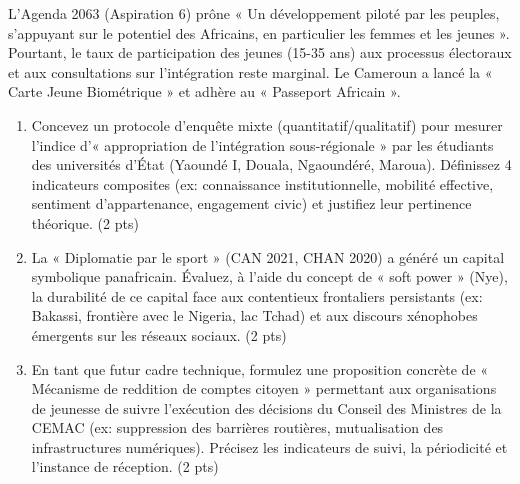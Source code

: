 \documentclass[11pt]{article}
\begin{document}
\begin{exercice}
L'Agenda 2063 (Aspiration 6) prône « Un développement piloté par les peuples, s'appuyant sur le potentiel des Africains, en particulier les femmes et les jeunes ». Pourtant, le taux de participation des jeunes (15-35 ans) aux processus électoraux et aux consultations sur l'intégration reste marginal. Le Cameroun a lancé la « Carte Jeune Biométrique » et adhère au « Passeport Africain ».
\begin{enumerate}
    \item Concevez un protocole d'enquête mixte (quantitatif/qualitatif) pour mesurer l'indice d'« appropriation de l'intégration sous-régionale » par les étudiants des universités d'État (Yaoundé I, Douala, Ngaoundéré, Maroua). Définissez 4 indicateurs composites (ex: connaissance institutionnelle, mobilité effective, sentiment d'appartenance, engagement civic) et justifiez leur pertinence théorique. (2 pts)
    \item La « Diplomatie par le sport » (CAN 2021, CHAN 2020) a généré un capital symbolique panafricain. Évaluez, à l'aide du concept de « soft power » (Nye), la durabilité de ce capital face aux contentieux frontaliers persistants (ex: Bakassi, frontière avec le Nigeria, lac Tchad) et aux discours xénophobes émergents sur les réseaux sociaux. (2 pts)
    \item En tant que futur cadre technique, formulez une proposition concrète de « Mécanisme de reddition de comptes citoyen » permettant aux organisations de jeunesse de suivre l'exécution des décisions du Conseil des Ministres de la CEMAC (ex: suppression des barrières routières, mutualisation des infrastructures numériques). Précisez les indicateurs de suivi, la périodicité et l'instance de réception. (2 pts)
\end{enumerate}
\end{exercice}
\end{document}
